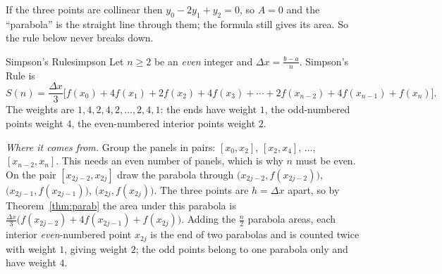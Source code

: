 \documentclass[11pt]{article}
\begin{document}
If the three points are collinear then $y_0-2y_1+y_2=0$, so $A=0$ and the ``parabola'' is the straight line through them; the formula still gives its area. So the rule below never breaks down.

\begin{defn}{Simpson's Rule}{simpson}
Let $n\ge2$ be an \emph{even} integer and $\Delta x=\frac{b-a}n$. Simpson's Rule is
\[S(n)=\frac{\Delta x}3\Big[f(x_0)+4f(x_1)+2f(x_2)+4f(x_3)+\cdots+2f(x_{n-2})+4f(x_{n-1})+f(x_n)\Big].\]
The weights are $1,4,2,4,2,\ldots,2,4,1$: the ends have weight $1$, the odd-numbered points weight $4$, the even-numbered interior points weight $2$.
\end{defn}

\emph{Where it comes from.} Group the panels in pairs: $[x_0,x_2]$, $[x_2,x_4]$, $\ldots$, $[x_{n-2},x_n]$. This needs an even number of panels, which is why $n$ must be even. On the pair $[x_{2j-2},x_{2j}]$ draw the parabola through $\big(x_{2j-2},f(x_{2j-2})\big)$, $\big(x_{2j-1},f(x_{2j-1})\big)$, $\big(x_{2j},f(x_{2j})\big)$. The three points are $h=\Delta x$ apart, so by Theorem~\ref{thm:parab} the area under this parabola is $\frac{\Delta x}3\big(f(x_{2j-2})+4f(x_{2j-1})+f(x_{2j})\big)$. Adding the $\frac n2$ parabola areas, each interior \emph{even}-numbered point $x_{2j}$ is the end of two parabolas and is counted twice with weight $1$, giving weight $2$; the odd points belong to one parabola only and have weight $4$.
\end{document}

